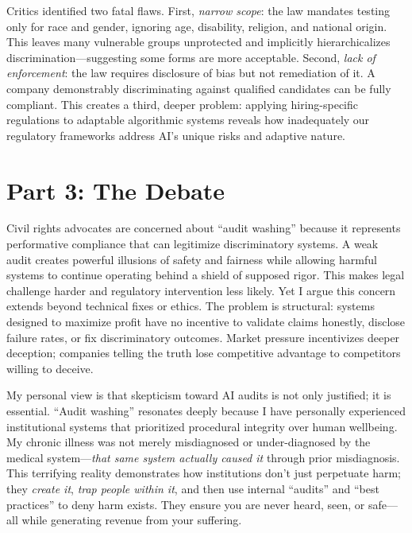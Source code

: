 \documentclass[12pt,twoside]{article}
\begin{document}
Critics identified two fatal flaws. First, \textit{narrow scope}: the law mandates testing only for race and gender, ignoring age, disability, religion, and national origin. This leaves many vulnerable groups unprotected and implicitly hierarchicalizes discrimination—suggesting some forms are more acceptable. Second, \textit{lack of enforcement}: the law requires disclosure of bias but not remediation of it. A company demonstrably discriminating against qualified candidates can be fully compliant. This creates a third, deeper problem: applying hiring-specific regulations to adaptable algorithmic systems reveals how inadequately our regulatory frameworks address AI's unique risks and adaptive nature.

\section{Part 3: The Debate}

Civil rights advocates are concerned about ``audit washing'' because it represents performative compliance that can legitimize discriminatory systems. A weak audit creates powerful illusions of safety and fairness while allowing harmful systems to continue operating behind a shield of supposed rigor. This makes legal challenge harder and regulatory intervention less likely. Yet I argue this concern extends beyond technical fixes or ethics. The problem is structural: systems designed to maximize profit have no incentive to validate claims honestly, disclose failure rates, or fix discriminatory outcomes. Market pressure incentivizes deeper deception; companies telling the truth lose competitive advantage to competitors willing to deceive.

My personal view is that skepticism toward AI audits is not only justified; it is essential. ``Audit washing'' resonates deeply because I have personally experienced institutional systems that prioritized procedural integrity over human wellbeing. My chronic illness was not merely misdiagnosed or under-diagnosed by the medical system—\textit{that same system actually caused it} through prior misdiagnosis. This terrifying reality demonstrates how institutions don't just perpetuate harm; they \textit{create it}, \textit{trap people within it}, and then use internal ``audits'' and ``best practices'' to deny harm exists. They ensure you are never heard, seen, or safe—all while generating revenue from your suffering.
\end{document}
